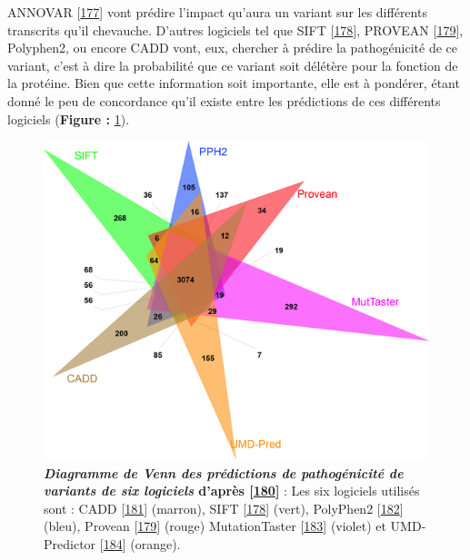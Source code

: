 \documentclass[12pt,a4paper,twoside]{ugathesis}
\theoremstyle{definition}
\theoremstyle{definition}
\theoremstyle{definition}
\theoremstyle{remark}
\begin{document}
\begin{enumerate}
\begin{enumerate}
    ANNOVAR {[}\protect\hyperlink{ref-Wang2010}{177}{]} vont prédire
    l'impact qu'aura un variant sur les différents transcrits qu'il
    chevauche. D'autres logiciels tel que SIFT
    {[}\protect\hyperlink{ref-Kumar2009}{178}{]}, PROVEAN
    {[}\protect\hyperlink{ref-Choi2012}{179}{]}, Polyphen2, ou encore
    CADD vont, eux, chercher à prédire la pathogénicité de ce variant,
    c'est à dire la probabilité que ce variant soit délétère pour la
    fonction de la protéine. Bien que cette information soit importante,
    elle est à pondérer, étant donné le peu de concordance qu'il existe
    entre les prédictions de ces différents logiciels (\textbf{Figure :}
    \ref{fig:pictvennpred}).
  \end{enumerate}
\end{enumerate}

\begin{figure}

{\centering \includegraphics[scale=.7]{figure/venn_Diag_patho_pred} 

}

\caption[Diagramme de Venn des prédictions de pathogénicité de variants de six logiciels]{\textbf{\emph{Diagramme de Venn des prédictions de
pathogénicité de variants de six logiciels} d'après
{[}\protect\hyperlink{ref-Salgado2016}{180}{]}} : Les six logiciels
utilisés sont : CADD {[}\protect\hyperlink{ref-Kircher2014}{181}{]}
(marron), SIFT {[}\protect\hyperlink{ref-Kumar2009}{178}{]} (vert),
PolyPhen2 {[}\protect\hyperlink{ref-Adzhubei2010}{182}{]} (bleu),
Provean {[}\protect\hyperlink{ref-Choi2012}{179}{]} (rouge)
MutationTaster {[}\protect\hyperlink{ref-Schwarz2010}{183}{]} (violet)
et UMD-Predictor {[}\protect\hyperlink{ref-Salgado2016a}{184}{]}
(orange).}\label{fig:pictvennpred}
\end{figure}
\end{document}
